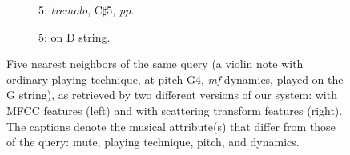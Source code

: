 \begin{figure}
        \begin{subfigure}{0.20\textwidth}
                \centering
                \caption*{5: \emph{tremolo}, C$\sharp$5, \emph{pp}.}
                \label{fig:Vn-trem-Csh5-pp-4c}
        \end{subfigure}%
        \begin{subfigure}{0.20\textwidth}
                \centering
                \caption*{5: on D string.}
                \label{fig:Vn-ord-G4-mf-3c}
        \end{subfigure}%

        \caption{Five nearest neighbors of the same query (a violin note with ordinary playing technique, at pitch G4, \emph{mf} dynamics, played on the G string), as retrieved by two different versions of our system: with MFCC features (left) and with scattering transform features (right). The captions denote the musical attribute(s) that differ from those of the query: mute, playing technique, pitch, and dynamics.
}\label{fig:demo-ordinary}
\end{figure}



